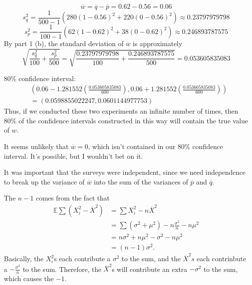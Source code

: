 \documentclass[12pt]{article}
\begin{document}
\medskip
{}

    $$\overline w = \overline q - \overline p = 0.62 - 0.56 = 0.06$$
    $$s_q^2 = \frac1{500-1} \left( 280(1-0.56)^2 + 220(0-0.56)^2 \right) \approx 0.23797979798$$
    $$s_p^2 = \frac1{100-1} \left( 62(1-0.62)^2 + 38(0-0.62)^2 \right) \approx 0.246893787575$$
    By part 1 (b), the standard deviation of $\overline w$ is approximately $$\sqrt{\frac{s_q^2}{100} + \frac{s_p^2}{500}} = \sqrt{\frac{0.23797979798}{100} + \frac{0.246893787575}{500}} = 0.053605835083$$

    80\% confidence interval:
    \begin{align*}
        & \left( 0.06 - 1.281552\left( \frac{0.053605835083}{600} \right), 0.06 + 1.281552\left( \frac{0.053605835083}{600} \right) \right) \\
        &= (0.0598855022247, 0.0601144977753)
    \end{align*} Thus, if we conducted these two experiments an infinite number of times, then 80\% of the confidence intervals constructed in this way will contain the true value of $w$.

\medskip
{} It seems unlikely that $\overline w = 0$, which isn't contained in our 80\% confidence interval. It's possible, but I wouldn't bet on it.

\medskip
{} It was important that the surveys were independent, since we need independence to break up the variance of $\overline w$ into the sum of the variances of $\overline p$ and $\overline q$.

\newpage
{}

\medskip
{} The $n-1$ comes from the fact that
\begin{align*}
    \mathbb E\sum(X_i^2 - \overline X^2) &= \sum X_i^2 - n\overline X^2 \\
                                         &= \sum(\sigma^2 + \mu^2) - n\frac{\sigma^2}{n} - n\mu^2 \\
                                         &= n\sigma^2 + n\mu^2 - \sigma^2 - n\mu^2 \\
                                         &= (n-1)\sigma^2.
\end{align*} Basically, the $X_i^2$s each contribute a $\sigma^2$ to the sum, and the $\overline X^2s$ each contrinbute a $-\frac{\sigma^2}n$ to the sum. Therefore, the $\overline X^2$s will contribute an extra $-\sigma^2$ to the sum, which causes the $-1$.
\end{document}
